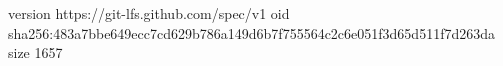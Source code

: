 version https://git-lfs.github.com/spec/v1
oid sha256:483a7bbe649ecc7cd629b786a149d6b7f755564c2c6e051f3d65d511f7d263da
size 1657
